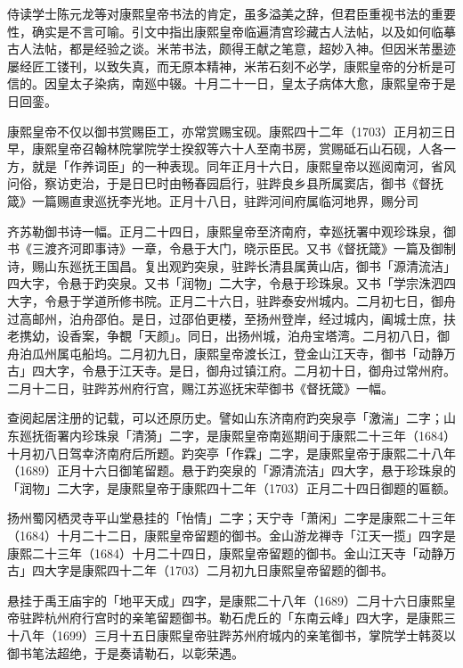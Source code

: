侍读学士陈元龙等对康熙皇帝书法的肯定，虽多溢美之辞，但君臣重视书法的重要性，确实是不言可喻。引文中指出康熙皇帝临遍清宫珍藏古人法帖，以及如何临摹古人法帖，都是经验之谈。米芾书法，颇得王献之笔意，超妙入神。但因米芾墨迹屡经匠工镂刊，以致失真，而无原本精神，米芾石刻不必学，康熙皇帝的分析是可信的。因皇太子染病，南廵中辍。十月二十一日，皇太子病体大愈，康熙皇帝于是日回銮。

康熙皇帝不仅以御书赏赐臣工，亦常赏赐宝砚。康熙四十二年（1703）正月初三日早，康熙皇帝召翰林院掌院学士揆叙等六十人至南书房，赏赐砥石山石砚，人各一方，就是「作养词臣」的一种表现。同年正月十六日，康熙皇帝以廵阅南河，省风问俗，察访吏治，于是日巳时由畅春园启行，驻跸良乡县所属窦店，御书《督抚箴》一篇赐直隶巡抚李光地。正月十八日，驻跸河间府属临河地界，赐分司

\vfill
\begin{BookNotes}
\end{BookNotes}

\noindent 齐苏勒御书诗一幅。正月二十四日，康熙皇帝至济南府，幸廵抚署中观珍珠泉，御书《三渡齐河即事诗》一章，令悬于大门，晓示臣民。又书《督抚箴》一篇及御制诗，赐山东廵抚王国昌。复出观趵突泉，驻跸长清县属黄山店，御书「源清流洁」四大字，令悬于趵突泉。又书「润物」二大字，令悬于珍珠泉。又书「学宗洙泗四大字，令悬于学道所修书院。正月二十六日，驻跸泰安州城内。二月初七日，御舟过高邮州，泊舟邵伯。是日，过邵伯更楼，至扬州登岸，经过城内，阖城士庶，扶老携幼，设香案，争覩「天颜」。同日，出扬州城，泊舟宝塔湾。二月初八日，御舟泊瓜州属屯船坞。二月初九日，康熙皇帝渡长江，登金山江天寺，御书「动静万古」四大字，令悬于江天寺。是日，御舟过镇江府。二月初十日，御舟过常州府。二月十二日，驻跸苏州府行宫，赐江苏巡抚宋荦御书《督抚箴》一幅。

查阅起居注册的记载，可以还原历史。譬如山东济南府趵突泉亭「激湍」二字；山东廵抚衙署内珍珠泉「清漪」二字，是康熙皇帝南廵期间于康熙二十三年（1684）十月初八日驾幸济南府后所题。趵突亭「作霖」二字，是康熙皇帝于康熙二十八年（1689）正月十六日御笔留题。悬于趵突泉的「源清流洁」四大字，悬于珍珠泉的「润物」二大字，是康熙皇帝于康熙四十二年（1703）正月二十四日御题的匾额。

扬州蜀冈栖灵寺平山堂悬挂的「怡情」二字；天宁寺「萧闲」二字是康熙二十三年（1684）十月二十二日，康熙皇帝留题的御书。金山游龙禅寺「江天一揽」四字是康熙二十三年（1684）十月二十四日，康熙皇帝留题的御书。金山江天寺「动静万古」四大字是康熙四十二年（1703）二月初九日康熙皇帝留题的御书。

悬挂于禹王庙宇的「地平天成」四字，是康熙二十八年（1689）二月十六日康熙皇帝驻跸杭州府行宫时的亲笔留题御书。勒石虎丘的「东南云峰」四大字，是康熙三十八年（1699）三月十五日康熙皇帝驻跸苏州府城内的亲笔御书，掌院学士韩菼以御书笔法超绝，于是奏请勒石，以彰荣遇。


